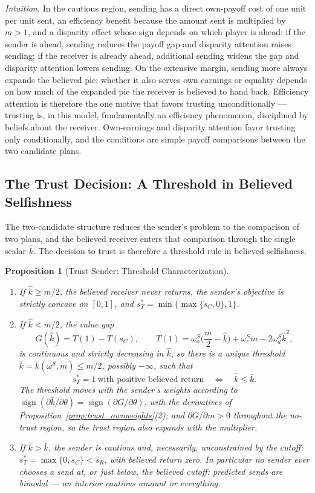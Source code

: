 \documentclass[11pt]{article}
\theoremstyle{plain}
\newtheorem{proposition}{Proposition}
\theoremstyle{remark}
\newcommand{\sgn}{\operatorname{sign}}
\begin{document}
\noindent\emph{Intuition.}  In the cautious region, sending has a direct own-payoff cost of one unit per unit sent, an efficiency benefit because the amount sent is multiplied by $m>1$, and a disparity effect whose sign depends on which player is ahead: if the sender is ahead, sending reduces the payoff gap and disparity attention raises sending; if the receiver is already ahead, additional sending widens the gap and disparity attention lowers sending.  On the extensive margin, sending more always expands the believed pie; whether it also serves own earnings or equality depends on how much of the expanded pie the receiver is believed to hand back.  Efficiency attention is therefore the one motive that favors trusting unconditionally --- trusting is, in this model, fundamentally an efficiency phenomenon, disciplined by beliefs about the receiver.  Own-earnings and disparity attention favor trusting only conditionally, and the conditions are simple payoff comparisons between the two candidate plans.

\subsection{The Trust Decision: A Threshold in Believed Selfishness}

The two-candidate structure reduces the sender's problem to the comparison of two plans, and the believed receiver enters that comparison through the single scalar $\hat k$.  The decision to trust is therefore a threshold rule in believed selfishness.

\begin{proposition}[Trust Sender: Threshold Characterization]
\label{prop:trust_linear}
\mbox{}
\begin{enumerate}[topsep=2pt,itemsep=2pt]
\item If $\hat k\ge m/2$, the believed receiver never returns, the sender's objective is strictly concave on $[0,1]$, and $s_T^\ast=\min\{\max\{\tilde s_C,0\},1\}$.
\item If $\hat k<m/2$, the value gap
\[
        G(\hat k)
        =
        T(1)-T(s_C),
        \qquad
        T(1)=\omega_o^S\Big(\frac m2-\hat k\Big)+\omega_e^S m-2\omega_d^S\hat k^2,
\]
is continuous and strictly decreasing in $\hat k$, so there is a unique threshold $\bar k=\bar k(\omega^S,m)\le m/2$, possibly $-\infty$, such that
\[
        s_T^\ast=1\ \text{with positive believed return}
        \quad\Longleftrightarrow\quad
        \hat k\le\bar k .
\]
The threshold moves with the sender's weights according to $\sgn(\partial\bar k/\partial\theta)=\sgn(\partial G/\partial\theta)$, with the derivatives of Proposition~\ref{prop:trust_ownweights}(2); and $\partial G/\partial m>0$ throughout the no-trust region, so the trust region also expands with the multiplier.
\item If $\hat k>\bar k$, the sender is cautious and, necessarily, unconstrained by the cutoff: $s_T^\ast=\max\{0,\tilde s_C\}<\hat s_R$, with believed return zero.  In particular no sender ever chooses a send at, or just below, the believed cutoff: predicted sends are bimodal --- an interior cautious amount or everything.
\end{enumerate}
\end{proposition}
\end{document}
